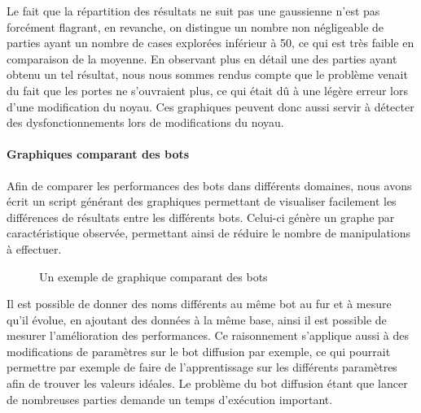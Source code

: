 \documentclass[a4paper,12pt]{article}
\begin{document}
Le fait que la répartition des résultats ne suit pas une gaussienne n'est pas
forcément flagrant, en revanche, on distingue un nombre non négligeable de
parties ayant un nombre de cases explorées inférieur à 50, ce qui est très
faible en comparaison de la moyenne. En observant plus en détail une des
parties ayant obtenu un tel résultat, nous nous sommes rendus compte que le
problème venait du fait que les portes ne s'ouvraient plus, ce qui était dû à
une légère erreur lors d'une modification du noyau. Ces graphiques peuvent
donc aussi servir à détecter des dysfonctionnements lors de modifications du
noyau.

\paragraph{Graphiques comparant des bots}
Afin de comparer les performances des bots dans différents domaines, nous
avons écrit un script générant des graphiques permettant de visualiser
facilement les différences de résultats entre les différents bots. Celui-ci
génère un graphe par caractéristique observée, permettant ainsi de réduire le
nombre de manipulations à effectuer.

\begin{figure}[H]
  \caption{\label{fig:move_graph} Un exemple de graphique comparant des bots}
\end{figure}

Il est possible de donner des noms différents au même bot au fur et à mesure
qu'il évolue, en ajoutant des données à la même base, ainsi il est possible de
mesurer l'amélioration des performances. Ce raisonnement s'applique aussi à
des modifications de paramètres sur le bot diffusion par exemple, ce qui
pourrait permettre par exemple de faire de l'apprentissage sur les différents
paramètres afin de trouver les valeurs idéales. Le problème du bot diffusion
étant que lancer de nombreuses parties demande un temps d'exécution important.
\end{document}
